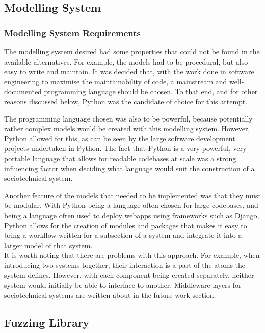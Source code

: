 \subsection{Modelling System}\label{planning_modelling}
\subsubsection{Modelling System Requirements}\label{planning_modelling_requirements}
The modelling system desired had some properties that could not be found in the available alternatives. For example, the models had to be procedural, but also easy to write and maintain. It was decided that, with the work done in software engineering to maximise the maintainability of code, a mainstream and well-documented programming language should be chosen. To that end, and for other reasons discussed below, Python was the candidate of choice for this attempt. \par
The programming language chosen was also to be powerful, because potentially rather complex models would be created with this modelling system. However, Python allowed for this, as can be seen by the large software development projects undertaken in Python. The fact that Python is a very powerful, very portable language that allows for readable codebases at scale was a strong influencing factor when deciding what language would suit the construction of a sociotechnical system. \par%
Another feature of the models that needed to be implemented was that they must be modular. With Python being a language often chosen for large codebases, and being a language often used to deploy webapps using frameworks such as Django, Python allows for the creation of modules and packages that makes it easy to bring a workflow written for a subsection of a system and integrate it into a larger model of that system. \\It is worth noting that there are problems with this approach. For example, when introducing two systems together, their interaction is a part of the atoms the system defines. However, with each component being created separately, neither system would initially be able to interface to another. Middleware layers for sociotechnical systems are written about in the future work section. \par \par%

\subsection{Fuzzing Library}\label{planning_fuzzing}
